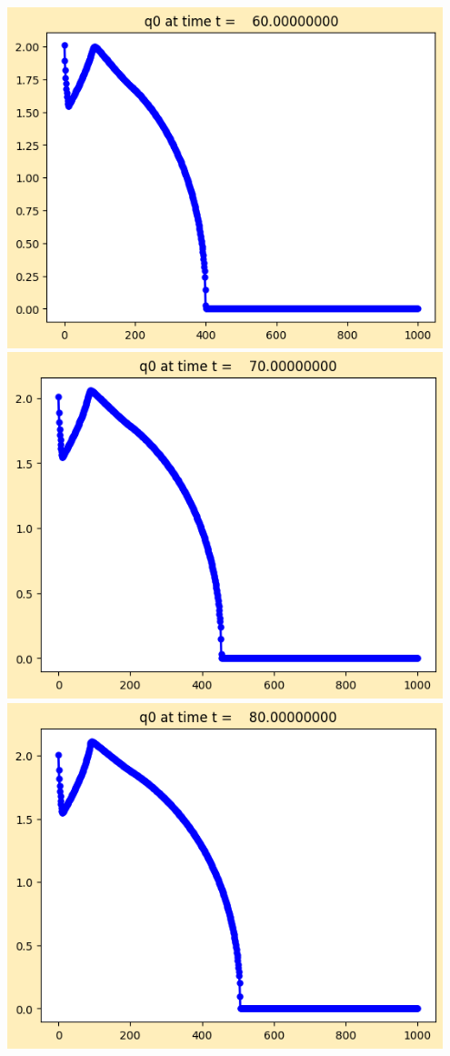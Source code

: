 \documentclass[11pt]{article}
\begin{document}
\vskip 10pt 
\includegraphics[width=0.95\textwidth]{frame0006fig1.png}
\vskip 10pt 
\includegraphics[width=0.95\textwidth]{frame0007fig1.png}
\vskip 10pt 
\includegraphics[width=0.95\textwidth]{frame0008fig1.png}
\end{document}

